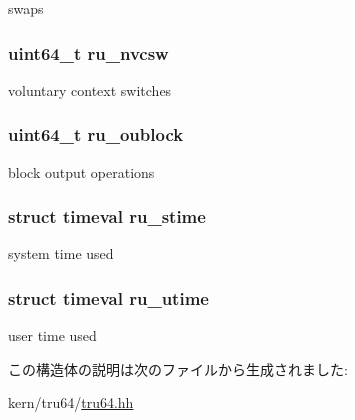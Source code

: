 swaps \hypertarget{structTru64_1_1rusage_aa283058b4b95b6777b3beb03ebaae43a}{
\subsubsection[{ru\_\-nvcsw}]{\setlength{\rightskip}{0pt plus 5cm}uint64\_\-t {\bf ru\_\-nvcsw}}}
\label{structTru64_1_1rusage_aa283058b4b95b6777b3beb03ebaae43a}


voluntary context switches \hypertarget{structTru64_1_1rusage_a9eddb1aed5f3e17217da06d264f01970}{
\subsubsection[{ru\_\-oublock}]{\setlength{\rightskip}{0pt plus 5cm}uint64\_\-t {\bf ru\_\-oublock}}}
\label{structTru64_1_1rusage_a9eddb1aed5f3e17217da06d264f01970}


block output operations \hypertarget{structTru64_1_1rusage_a15f836efd7b69c0a0eb19f5d9505e3e9}{
\subsubsection[{ru\_\-stime}]{\setlength{\rightskip}{0pt plus 5cm}struct {\bf timeval} {\bf ru\_\-stime}}}
\label{structTru64_1_1rusage_a15f836efd7b69c0a0eb19f5d9505e3e9}


system time used \hypertarget{structTru64_1_1rusage_a40e27c5d4340b0c6532787d6740b22ab}{
\subsubsection[{ru\_\-utime}]{\setlength{\rightskip}{0pt plus 5cm}struct {\bf timeval} {\bf ru\_\-utime}}}
\label{structTru64_1_1rusage_a40e27c5d4340b0c6532787d6740b22ab}


user time used 

この構造体の説明は次のファイルから生成されました:\begin{DoxyCompactItemize}
\item 
kern/tru64/\hyperlink{kern_2tru64_2tru64_8hh}{tru64.hh}\end{DoxyCompactItemize}
